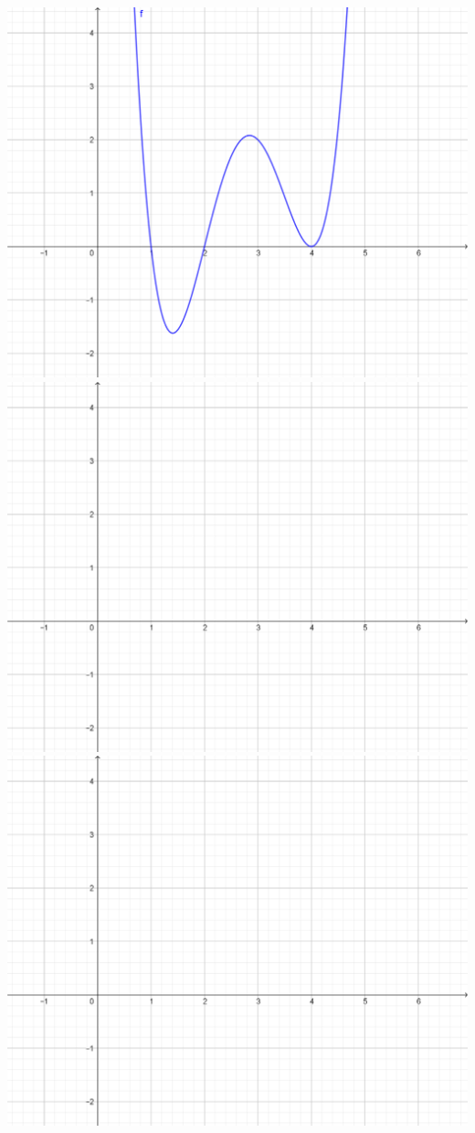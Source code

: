 \documentclass[oneside]{book}
\begin{document}
	\begin{landscape}
		\centering
		\includegraphics[scale=0.85]{Bilder/UB_fkt.png}\\
		\includegraphics[scale=0.85]{Bilder/UB_Koord.png}\\
		\includegraphics[scale=0.85]{Bilder/UB_Koord.png}
	\end{landscape}
\end{document}
